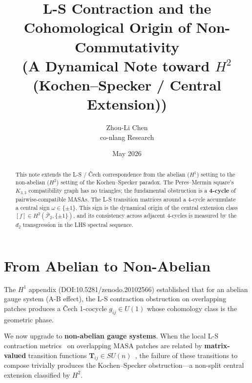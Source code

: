 \documentclass[11pt]{article}
\begin{document}
\title{L-S Contraction and the Cohomological Origin of Non-Commutativity\\
{\large (A Dynamical Note toward $H^2$ (Kochen--Specker / Central Extension))}}

\author{Zhou-Li Chen \\ co-nlang Research}
\date{May 2026}

\maketitle

\begin{abstract}
This note extends the L-S / \v{C}ech correspondence from the abelian ($H^1$)
setting to the non-abelian ($H^2$) setting of the Kochen--Specker paradox.
The Peres--Mermin square's $K_{3,3}$ compatibility graph has no triangles;
the fundamental obstruction is a \textbf{4-cycle} of pairwise-compatible MASAs.
The L-S transition matrices around a 4-cycle accumulate a central sign
$\omega \in \{\pm 1\}$. This sign is the dynamical origin of the central
extension class $[f] \in H^2(\bar{\mathcal{P}}_2, \{\pm 1\})$, and its
consistency across adjacent 4-cycles is measured by the $d_2$ transgression
in the LHS spectral sequence.
\end{abstract}

\section{From Abelian to Non-Abelian}
\label{sec:intro}

The $H^1$ appendix (DOI:10.5281/zenodo.20102566) established that for an abelian gauge
system (A-B effect), the L-S contraction obstruction on overlapping patches
produces a \v{C}ech 1-cocycle $g_{ij} \in U(1)$ whose cohomology class is
the geometric phase.

We now upgrade to \textbf{non-abelian gauge systems}. When the local L-S
contraction metrics~\cite{LohmillerSlotine1998} on overlapping MASA patches are related by
\textbf{matrix-valued} transition functions
$\mathbf{T}_{ij} \in SU(n)$~\cite{WilczekZee1984}, the failure of these transitions to compose
trivially produces the Kochen--Specker obstruction---a non-split central
extension classified by $H^2$.
\end{document}
